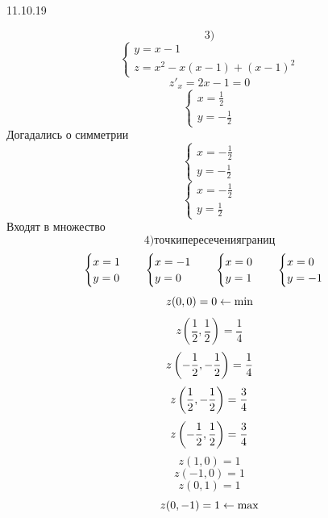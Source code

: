 \documentclass[matan.tex]{subfiles}
\begin{document}
\begin{lect} {11.10.19}
\begin{Task}[1]
            \hline
            \[3)\]
            \[\begin{cases}
                y = x - 1\\
                z = x^2 - x(x - 1) + (x - 1)^2
            \end{cases}\]
            \[z'_x = 2x - 1 = 0\]
            \[\begin{cases}
                x = \frac{1}{2}\\
                y = -\frac{1}{2}
            \end{cases}\]
            Догадались о симметрии
            \[\begin{cases}
                x = - \frac{1}{2}\\
                y = - \frac{1}{2}
            \end{cases}\]
            \[\begin{cases}
                x = -\frac{1}{2}\\
                y = \frac{1}{2}
            \end{cases}\]
            Входят в множество
            \hline
            \[4) точки пересечения границ\]
            \[\begin{cases}
                x = 1\\
                y = 0
            \end{cases} \quad \begin{cases}
                x = -1\\
                y = 0
            \end{cases} \quad \begin{cases}
                x = 0\\
                y = 1
            \end{cases} \quad \begin{cases}
                x = 0\\
                y = -1
            \end{cases}\]
            \[z(0, 0) = 0 \leftarrow \min\]
            \[z\left(\frac{1}{2}, \frac{1}{2}\right) = \frac{1}{4}\]
            \[z\left(-\frac{1}{2}, -\frac{1}{2}\right) = \frac{1}{4}\]
            \[z\left(\frac{1}{2}, -\frac{1}{2}\right) = \frac{3}{4}\]
            \[z\left(-\frac{1}{2}, \frac{1}{2}\right) = \frac{3}{4}\]
            \[z(1, 0) = 1\]
            \[z(-1, 0) = 1\]
            \[z(0, 1) = 1\]
            \[z(0, -1) = 1 \leftarrow \max\]
        \end{Task}


\end{lect}
\end{document}
